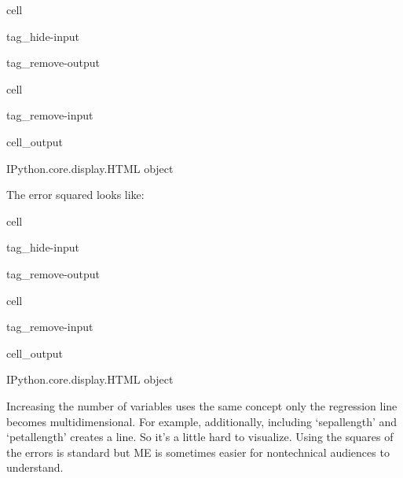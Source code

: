 \documentclass[letterpaper,10pt,english]{jupyterBook}
\begin{document}
\begin{sphinxuseclass}{cell}
\begin{sphinxuseclass}{tag_hide-input}
\begin{sphinxuseclass}{tag_remove-output}
\end{sphinxuseclass}
\end{sphinxuseclass}
\end{sphinxuseclass}
\begin{sphinxuseclass}{cell}
\begin{sphinxuseclass}{tag_remove-input}\begin{sphinxVerbatimOutput}

\begin{sphinxuseclass}{cell_output}
\begin{sphinxVerbatim}[commandchars=\\\{\}]
\PYGZlt{}IPython.core.display.HTML object\PYGZgt{}
\end{sphinxVerbatim}

\end{sphinxuseclass}\end{sphinxVerbatimOutput}

\end{sphinxuseclass}
\end{sphinxuseclass}
\sphinxAtStartPar
The error squared looks like:

\begin{sphinxuseclass}{cell}
\begin{sphinxuseclass}{tag_hide-input}
\begin{sphinxuseclass}{tag_remove-output}
\end{sphinxuseclass}
\end{sphinxuseclass}
\end{sphinxuseclass}
\begin{sphinxuseclass}{cell}
\begin{sphinxuseclass}{tag_remove-input}\begin{sphinxVerbatimOutput}

\begin{sphinxuseclass}{cell_output}
\begin{sphinxVerbatim}[commandchars=\\\{\}]
\PYGZlt{}IPython.core.display.HTML object\PYGZgt{}
\end{sphinxVerbatim}

\end{sphinxuseclass}\end{sphinxVerbatimOutput}

\end{sphinxuseclass}
\end{sphinxuseclass}
\sphinxAtStartPar
Increasing the number of variables uses the same concept only the regression line becomes multi\sphinxhyphen{}dimensional. For example, additionally, including ‘sepal\sphinxhyphen{}length’ and ‘petal\sphinxhyphen{}length’ creates a  line. So it’s a little hard to visualize. Using the squares of the errors is standard but ME is sometimes easier for non\sphinxhyphen{}technical audiences to understand.
\end{document}
